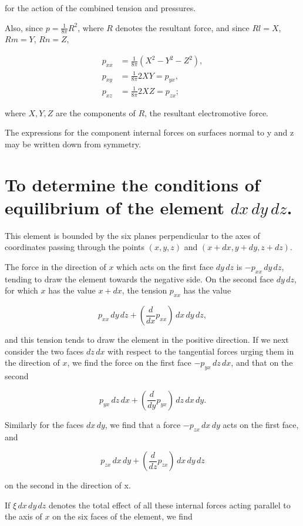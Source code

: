 \documentclass[11pt,a4paper]{article}
\begin{document}
for the action of the combined tension and pressures.

Also, since $p=\frac{1}{8\pi}R^2$, where $R$ denotes the resultant force, and since $Rl=X$, $Rm=Y$, $Rn=Z$,

\begin{equation}\tag{6}
\begin{split}
p_{xx}&=\frac{1}{8\pi}(X^2-Y^2-Z^2),\\
p_{xy}&=\frac{1}{8\pi}2XY=p_{yx},\\
p_{xz}&=\frac{1}{8\pi}2XZ=p_{zx};
\end{split}
\end{equation}

where $X,Y,Z$ are the components of $R$, the resultant electromotive force.

The expressions for the component internal forces on surfaces normal to y and z may be written down from symmetry.

\section*{To determine the conditions of equilibrium of the element $dx\,dy\,dz$.}

This element is bounded by the six planes perpendicular to the axes of coordinates passing through the points $(x,y,z)$ and $(x+dx,y+dy,z+dz)$.

The force in the direction of $x$ which acts on the first face $dy\,dz$ is $-p_{xx}\,dy\,dz$, tending to draw the element towards the negative side. On the second face $dy\,dz$, for which $x$ has the value $x+dx$, the tension $p_{xx}$ has the value

\[
p_{xx}\,dy\,dz+\left(\frac{d}{dx}p_{xx}\right)\,dx\,dy\,dz,
\]

and this tension tends to draw the element in the positive direction. If we next consider the two faces $dz\,dx$ with respect to the tangential forces urging them in the direction of $x$, we find the force on the first face $-p_{yx}\,dz\,dx$, and that on the second

\[
p_{yx}\,dz\,dx+\left(\frac{d}{dy}p_{yx}\right)\,dz\,dx\,dy.
\]

Similarly for the faces $dx\,dy$, we find that a force $-p_{zx}\,dx\,dy$ acts on the first face, and

\[
p_{zx}\,dx\,dy+\left(\frac{d}{dz}p_{zx}\right)\,dx\,dy\,dz
\]

on the second in the direction of x.

If $\xi\,dx\,dy\,dz$ denotes the total effect of all these internal forces acting parallel to the axis of $x$ on the six faces of the element, we find
\end{document}
